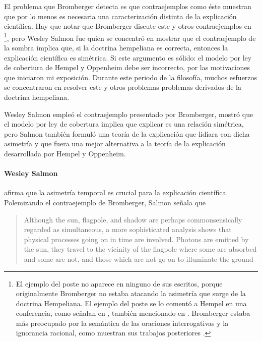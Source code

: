 El problema que Bromberger detecta es que contraejemplos como éste
muestran que por lo menos es necesaria una caracterización distinta
de la explicación científica. Hay que notar que Bromberger discute
este y otros contraejemplos en \parencite{Bromberger1966}\footnote{
	El ejemplo del poste no aparece en ninguno de sus escritos, porque
	originalmente Bromberger no estaba atacando la asimetría que surge de
	la doctrina Hempeliana. El ejemplo del poste se lo comentó a Hempel
	en una conferencia, como señalan en \parencite{mitBromberger}, también mencionado en \parencite[p.~81]{Dewulf2022}. Bromberger estaba más preocupado por la semántica de las oraciones	interrogativas y la ignorancia racional, como muestran sus trabajos	posteriores \parencite {Bromberger1992}.
},
pero Wesley Salmon fue quien se concentró en mostrar que el contraejemplo
de la sombra implica que, si la doctrina hempeliana es correcta, entonces
la explicación científica es simétrica. Si este argumento es sólido: el
modelo por ley de cobertura de Hempel y Oppenheim debe ser incorrecto, por
las motivaciones que iniciaron mi exposición. Durante este periodo de la
filosofía, muchos esfuerzos se concentraron en resolver este y otros
problemas problemas derivados de la doctrina hempeliana.

Wesley Salmon empleó el contraejemplo presentado por Bromberger,
mostró que el modelo por ley de cobertura implica que explicar es una
relación simétrica, pero Salmon también formuló una teoría de la explicación que lidiara con dicha asimetría y que fuera una mejor alternativa a la teoría de la explicación desarrollada por Hempel y Oppenheim.

\paragraph{Wesley Salmon \parencite{Salmon1970}} afirma que la asimetría
temporal es crucial para la explicación científica. Polemizando el
contraejemplo de Bromberger, Salmon señala que

\begin{quote}
	Although the sun, flagpole, and shadow are perhaps commonsensically
	regarded as simultaneous, a more sophisticated analysis shows that
	physical processes going on in time are involved.	Photons are emitted by
	the sun, they travel to the	vicinity of the flagpole where some
	are absorbed and some are	not, and those which are not go on to
	illuminate the ground \parencite[p.~72]{Salmon1970}
\end{quote}

